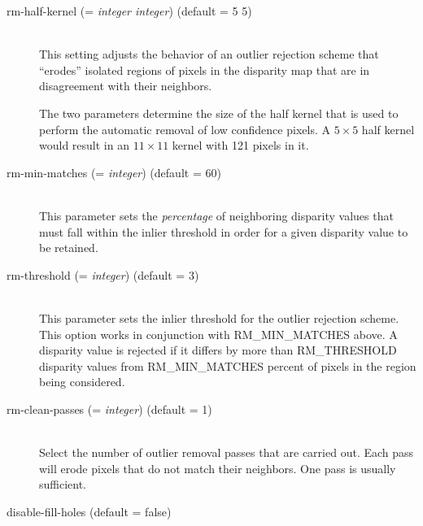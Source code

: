 \begin{description}

\item[rm-half-kernel \textnormal{\small{(= \emph{integer integer})}} (default = 5 5)] \hfill \\
  This setting adjusts the behavior of an outlier rejection scheme
  that ``erodes'' isolated regions of pixels in the disparity map that
  are in disagreement with their neighbors.

  The two parameters determine the size of the half kernel that is
  used to perform the automatic removal of low confidence pixels.  A
  $5 \times 5$ half kernel would result in an $11 \times 11$ kernel
  with 121 pixels in it.

\item[rm-min-matches \textnormal{\small{(= \emph{integer})}} (default = 60)] \hfill \\
  This parameter sets the {\em percentage} of neighboring disparity
  values that must fall within the inlier threshold in order for a
  given disparity value to be retained.

\item[rm-threshold \textnormal{\small{(= \emph{integer})}} (default = 3)] \hfill \\
  This parameter sets the inlier threshold for the outlier rejection
  scheme.  This option works in conjunction with RM\_MIN\_MATCHES
  above.  A disparity value is rejected if it differs by more than
  RM\_THRESHOLD disparity values from RM\_MIN\_MATCHES percent of
  pixels in the region being considered.

\item[rm-clean-passes \textnormal{\small{(= \emph{integer})}} (default = 1)] \hfill \\
  Select the number of outlier removal passes that are carried out.
  Each pass will erode pixels that do not match their neighbors.  One
  pass is usually sufficient.

%
\item[disable-fill-holes (default = false)] \hfill \\


\end{description}
